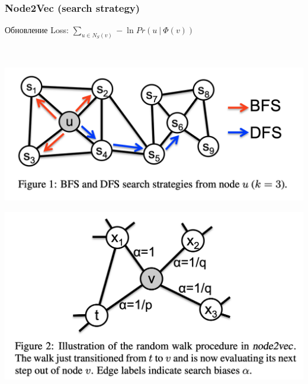 \documentclass{beamer}
\newcommand{\skipline}[0]{$ $\\}
\begin{document}
\begin{frame}
    \frametitle{Node2Vec (search strategy)}
    \begin{block}{Обновление}
        Loss: $\sum_{u \in N_S  (v)} -\ln Pr\left(u \ \vert\ \varPhi(v)\right)$
    \end{block}
    \skipline
    \begin{multicols}{2}
        \includegraphics[width=1\columnwidth]{bfs_dfs.png}\par 
        \includegraphics[width=1\columnwidth]{step.png}\par 
    \end{multicols}
\end{frame}
\end{document}
